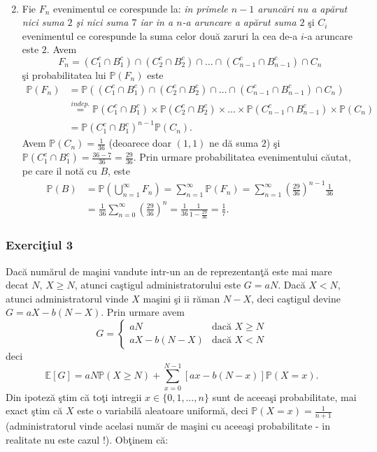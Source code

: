 \documentclass[]{article}
\def\PP{{\mathbb P}}
\def\EE{{\mathbb E}}
\begin{document}
\begin{enumerate}
\begin{align*}
\end{align*}
\item Fie $F_n$ evenimentul ce corespunde la: \textit{in primele $n-1$ arunc\u ari nu a ap\u arut nici suma $2$ \c si nici suma $7$ iar in a $n$-a aruncare a ap\u arut suma $2$} \c si $C_i$ evenimentul ce corespunde la suma celor dou\u a zaruri la cea de-a $i$-a aruncare este $2$. Avem
    \begin{equation*}
        F_n = (C_1^c\cap B_1^c)\cap(C_2^c\cap B_2^c)\cap\dots\cap(C_{n-1}^c\cap B_{n-1}^c)\cap C_n
    \end{equation*}
\c si probabilitatea lui $\PP(F_n)$ este
    \begin{align*}
        \PP(F_n) &= \PP((C_1^c\cap B_1^c)\cap(C_2^c\cap B_2^c)\cap\dots\cap(C_{n-1}^c\cap B_{n-1}^c)\cap C_n)\\
                 &\overset{indep.}{=} \PP(C_1^c\cap B_1^c)\times \PP(C_2^c\cap B_2^c)\times\dots\times \PP(C_{n-1}^c\cap B_{n-1}^c)\times \PP(C_n)\\
                 &= \PP(C_1^c\cap B_1^c)^{n-1}\PP(C_n).
    \end{align*}
Avem $\PP(C_n) = \frac{1}{36}$ (deoarece doar $(1,1)$ ne d\u a suma $2$) \c si $\PP(C_1^c\cap B_1^c) = \frac{36-7}{36} = \frac{29}{36}$. Prin urmare probabilitatea evenimentului c\u autat, pe care il not\u a cu $B$, este
\begin{align*}
    \PP(B) &= \displaystyle\PP\left(\bigcup_{n=1}^{\infty}F_n\right)=\sum_{n=1}^{\infty}\PP(F_n)=\sum_{n=1}^{\infty}\left(\frac{29}{36}\right)^{n-1}\frac{1}{36}\\
            &= \frac{1}{36}\sum_{n=0}^{\infty}\left(\frac{29}{36}\right)^{n} = \frac{1}{36}\frac{1}{1-\frac{29}{36}}=\frac{1}{7}.
\end{align*}
\end{enumerate}

\subsubsection{\texorpdfstring{Exerci\c tiul
3}{Exerciiul 3}}\label{exerciiul-3}

Dac\u a num\u arul de ma\c sini vandute intr-un an de
reprezentan\c t\u a este mai mare decat \(N\), \(X\geq N\), atunci
ca\c stigul administratorului este \(G=aN\). Dac\u a \(X<N\), atunci
administratorul vinde \(X\) ma\c sini \c si ii r\u aman \(N-X\), deci
ca\c stigul devine \(G=aX-b(N-X)\). Prin urmare avem \[
  G = \left\{\begin{array}{ll}
    aN & \mbox{dac\u a } X\geq N\\
    aX-b(N-X) & \mbox{dac\u a } X<N
  \end{array}\right.
\] deci \[
  \EE[G] = aN\PP(X\geq N)+ \displaystyle\sum_{x=0}^{N-1}[ax-b(N-x)]\PP(X=x).
\] Din ipotez\u a \c stim c\u a to\c ti intregii \(x\in\{0,1,\dots,n\}\)
sunt de aceea\c si probabilitate, mai exact \c stim c\u a \(X\) este o
variabil\u a aleatoare uniform\u a, deci \(\PP(X=x)=\frac{1}{n+1}\)
(administratorul vinde acelasi num\u ar de ma\c sini cu aceea\c si
probabilitate - in realitate nu este cazul !). Ob\c tinem c\u a:
\end{document}
